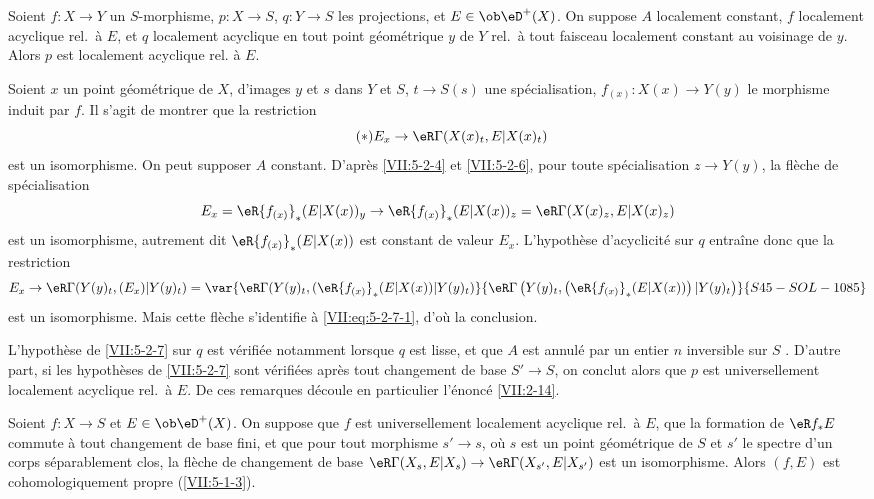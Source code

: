 \begin{corollary}\label{VII:5-2-7}
Soient $f:X\to Y$ un $S$-morphisme, $p:X\to S$, $q:Y\to S$ les projections, et 
$E\in\ob\eD^+(X)$. On suppose $A$ localement constant, $f$ localement acyclique 
rel.\ à $E$, et $q$ localement acyclique en tout point géométrique $y$ de 
$Y$ rel.\ à tout faisceau localement constant au voisinage de $y$. Alors $p$ 
est localement acyclique rel. à $E$. 
\end{corollary}

Soient $x$ un point géométrique de $X$, d'images $y$ et $s$ dans $Y$ et 
$S$, $t\to S(s)$ une spécialisation, $f_{(x)}:X(x)\to Y(y)$ le morphisme 
induit par $f$. Il s'agit de montrer que la restriction 
\begin{equation*}\tag{$*$}\label{VII:eq:5-2-7-1}
  E_x \to \eR\Gamma(X(x)_t,E|X(x)_t) 
\end{equation*}
est un isomorphisme. On peut supposer $A$ constant. D'après \ref{VII:5-2-4} et 
\ref{VII:5-2-6}, pour toute spécialisation $z\to Y(y)$, la flèche de 
spécialisation 
\[
  E_x = \eR {f_{(x)}}_\ast (E|X(x))_y \to \eR {f_{(x)}}_\ast (E|X(x))_z = \eR\Gamma(X(x)_z,E|X(x)_z) 
\]
est un isomorphisme, autrement dit $\eR{f_{(x)}}_\ast(E|X(x))$ est constant de 
valeur $E_x$. L'hypothèse d'acyclicité sur $q$ entra\^ine donc que la 
restriction 
\[
  E_x \to \eR\Gamma(Y(y)_t,(E_x)|Y(y)_t) = \var{\eR\Gamma(Y(y)_t,(\eR {f_{(x)}}_\ast (E|X(x))|Y(y)_t)}{\eR\Gamma\left(Y(y)_t,\left(\eR {f_{(x)}}_\ast (E|X(x))\right)|Y(y)_t\right)}{S45-SOL-1085}
\]
est un isomorphisme. Mais cette flèche s'identifie à 
\eqref{VII:eq:5-2-7-1}, d'où la conclusion. 

L'hypothèse de \ref{VII:5-2-7} sur $q$ est vérifiée notamment lorsque $q$ 
est lisse, et que $A$ est annulé par un entier $n$ inversible sur $S$ 
\cite[XV]{sga4}. D'autre part, si les hypothèses de \ref{VII:5-2-7} sont 
vérifiées après tout changement de base $S'\to S$, on conclut alors que 
$p$ est universellement localement acyclique rel.\ à $E$. De ces remarques 
découle en particulier l'énoncé \ref{VII:2-14}. 





\begin{corollary}\label{VII:5-2-8}
Soient $f:X\to S$ et $E\in \ob\eD^+(X)$. On suppose que $f$ est universellement 
localement acyclique rel.\ à $E$, que la formation de $\eR f_\ast E$ commute 
à tout changement de base fini, et que pour tout morphisme $s'\to s$, où 
$s$ est un point géométrique de $S$ et $s'$ le spectre d'un corps 
séparablement clos, la flèche de changement de base 
$\eR\Gamma(X_s,E|X_s)\to \eR\Gamma(X_{s'},E|X_{s'})$ est un isomorphisme. 
Alors $(f,E)$ est cohomologiquement propre (\ref{VII:5-1-3}). 
\end{corollary}

